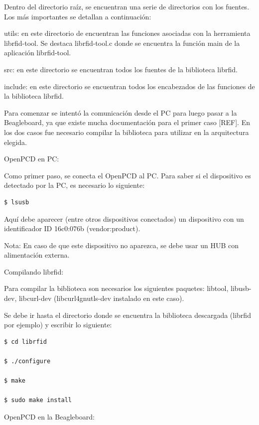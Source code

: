 Dentro del directorio raíz, se encuentran una serie de directorios con los fuentes. Los más importantes se detallan a continuación:

\bigskip
utils: en este directorio de encuentran las funciones asociadas con la herramienta librfid-tool. Se destaca librfid-tool.c donde se encuentra la función main de la aplicación librfid-tool.

\bigskip
src: en este directorio se encuentran todos los fuentes de la biblioteca librfid.

\bigskip
include: en este directorio se encuentran todos los encabezados de las funciones de la biblioteca librfid.


\bigskip
{}

\bigskip
Para comenzar se intentó la comunicación desde el PC para luego pasar a la Beagleboard, ya que existe mucha documentación para el primer caso [REF]. En los dos casos fue necesario compilar la biblioteca para utilizar en la arquitectura elegida.

\bigskip
OpenPCD en PC:

\bigskip
Como primer paso, se conecta el OpenPCD al PC. Para saber si el dispositivo es detectado por la PC, es necesario lo siguiente:

\begin{verbatim}
$ lsusb
\end{verbatim}

Aquí debe aparecer (entre otros dispositivos conectados) un dispositivo con un identificador ID 16c0:076b (vendor:product). 

\bigskip
Nota: En caso de que este dispositivo no aparezca, se debe usar un HUB con alimentación externa.

\bigskip
Compilando librfid:

\bigskip
Para compilar la biblioteca son necesarios los siguientes paquetes: libtool, libusb-dev, libcurl-dev (libcurl4gnutls-dev instalado en este caso).

\bigskip
Se debe ir hasta el directorio donde se encuentra la biblioteca descargada (librfid por ejemplo) y escribir lo siguiente:

\begin{verbatim}
$ cd librfid

$ ./configure

$ make

$ sudo make install
\end{verbatim}

OpenPCD en la Beagleboard:

